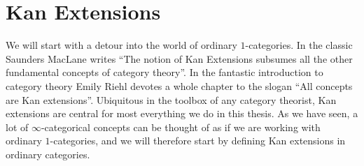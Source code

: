 \documentclass[../../thesis.tex]{subfiles}
\begin{document}
\section{Kan Extensions}\label{KanSection}
We will start with a detour into the world of ordinary $1$-categories.
In the  classic \cite{MacLane} Saunders MacLane writes ``The notion of Kan Extensions subsumes all the other fundamental concepts of category theory''.
In the fantastic introduction to category theory \cite{CatContext} Emily Riehl devotes a whole chapter to the slogan ``All concepts are Kan extensions''.
Ubiquitous in the toolbox of any category theorist, Kan extensions are central for most everything we do in this thesis.
As we have seen, a lot of $\infty$-categorical concepts can be thought of as if we are working with ordinary $1$-categories, and we will therefore start by defining Kan extensions in ordinary categories.
\end{document}
